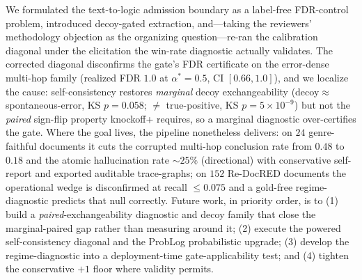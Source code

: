 \documentclass[11pt,letterpaper]{article}
\begin{document}
We formulated the text-to-logic admission boundary as a label-free FDR-control problem, introduced decoy-gated extraction, and---taking the reviewers' methodology objection as the organizing question---re-ran the calibration diagonal under the elicitation the win-rate diagnostic actually validates. The corrected diagonal disconfirms the gate's FDR certificate on the error-dense multi-hop family (realized FDR $1.0$ at $\alpha^{*}=0.5$, CI $[0.66,1.0]$), and we localize the cause: self-consistency restores \emph{marginal} decoy exchangeability (decoy$\approx$spontaneous-error, KS $p=0.058$; $\neq$ true-positive, KS $p=5\times10^{-9}$) but not the \emph{paired} sign-flip property knockoff+ requires, so a marginal diagnostic over-certifies the gate. Where the goal lives, the pipeline nonetheless delivers: on $24$ genre-faithful documents it cuts the corrupted multi-hop conclusion rate from $0.48$ to $0.18$ and the atomic hallucination rate $\sim 25\%$ (directional) with conservative self-report and exported auditable trace-graphs; on $152$ Re-DocRED documents the operational wedge is disconfirmed at recall $\le0.075$ and a gold-free regime-diagnostic predicts that null correctly. Future work, in priority order, is to (1) build a \emph{paired}-exchangeability diagnostic and decoy family that close the marginal-paired gap rather than measuring around it; (2) execute the powered self-consistency diagonal and the ProbLog probabilistic upgrade; (3) develop the regime-diagnostic into a deployment-time gate-applicability test; and (4) tighten the conservative $+1$ floor where validity permits.



\end{document}

